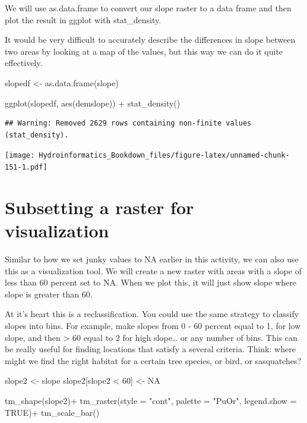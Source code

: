 \documentclass[
]{book}
\newenvironment{Shaded}{\begin{snugshade}}{\end{snugshade}}
\newcommand{\AttributeTok}[1]{\textcolor[rgb]{0.77,0.63,0.00}{#1}}
\newcommand{\ConstantTok}[1]{\textcolor[rgb]{0.00,0.00,0.00}{#1}}
\newcommand{\DecValTok}[1]{\textcolor[rgb]{0.00,0.00,0.81}{#1}}
\newcommand{\FunctionTok}[1]{\textcolor[rgb]{0.00,0.00,0.00}{#1}}
\newcommand{\NormalTok}[1]{#1}
\newcommand{\OtherTok}[1]{\textcolor[rgb]{0.56,0.35,0.01}{#1}}
\newcommand{\SpecialCharTok}[1]{\textcolor[rgb]{0.00,0.00,0.00}{#1}}
\newcommand{\StringTok}[1]{\textcolor[rgb]{0.31,0.60,0.02}{#1}}
\begin{document}
We will use as.data.frame to convert our slope raster to a data frame and then plot the result in ggplot with stat\_density.

It would be very difficult to accurately describe the differences in slope between two areas by looking at a map of the values, but this way we can do it quite effectively.

\begin{Shaded}
\begin{Highlighting}[]
\NormalTok{slopedf }\OtherTok{\textless{}{-}} \FunctionTok{as.data.frame}\NormalTok{(slope)}

\FunctionTok{ggplot}\NormalTok{(slopedf, }\FunctionTok{aes}\NormalTok{(demslope)) }\SpecialCharTok{+}
  \FunctionTok{stat\_density}\NormalTok{()}
\end{Highlighting}
\end{Shaded}

\begin{verbatim}
## Warning: Removed 2629 rows containing non-finite values (stat_density).
\end{verbatim}

\texttt{[image: Hydroinformatics\_Bookdown\_files/figure-latex/unnamed-chunk-151-1.pdf]}

\hypertarget{subsetting-a-raster-for-visualization}{%
\section{Subsetting a raster for visualization}\label{subsetting-a-raster-for-visualization}}

Similar to how we set junky values to NA earlier in this activity, we can also use this as a visualization tool. We will create a new raster with areas with a slope of less than 60 percent set to NA. When we plot this, it will just show slope where slope is greater than 60.

At it's heart this is a reclassification. You could use the same strategy to classify slopes into bins. For example, make slopes from 0 - 60 percent equal to 1, for low slope, and then \textgreater{} 60 equal to 2 for high slope\ldots{} or any number of bins. This can be really useful for finding locations that satisfy a several criteria. Think: where might we find the right habitat for a certain tree species, or bird, or sasquatches?

\begin{Shaded}
\begin{Highlighting}[]
\NormalTok{slope2 }\OtherTok{\textless{}{-}}\NormalTok{ slope}
\NormalTok{slope2[slope2 }\SpecialCharTok{\textless{}} \DecValTok{60}\NormalTok{] }\OtherTok{\textless{}{-}} \ConstantTok{NA}

\FunctionTok{tm\_shape}\NormalTok{(slope2)}\SpecialCharTok{+}
  \FunctionTok{tm\_raster}\NormalTok{(}\AttributeTok{style =} \StringTok{"cont"}\NormalTok{, }\AttributeTok{palette =} \StringTok{"PuOr"}\NormalTok{, }\AttributeTok{legend.show =} \ConstantTok{TRUE}\NormalTok{)}\SpecialCharTok{+}
  \FunctionTok{tm\_scale\_bar}\NormalTok{()}
\end{Highlighting}
\end{Shaded}
\end{document}
